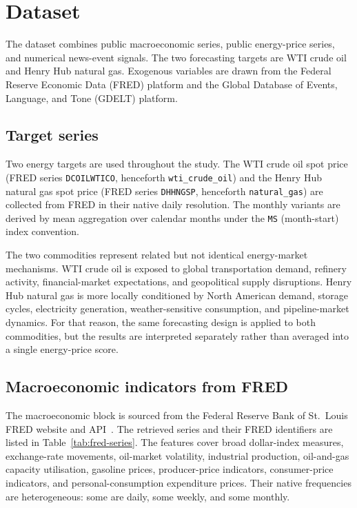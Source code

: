 \documentclass[11pt,a4paper]{article}
\begin{document}
\section{Dataset}\label{sec:dataset}

The dataset combines public macroeconomic series, public energy-price series, and numerical news-event signals. The two forecasting targets are WTI crude oil and Henry Hub natural gas. Exogenous variables are drawn from the Federal Reserve Economic Data (FRED) platform and the Global Database of Events, Language, and Tone (GDELT) platform.

\subsection{Target series}

Two energy targets are used throughout the study. The WTI crude oil spot price (FRED series \texttt{DCOILWTICO}, henceforth \texttt{wti\_crude\_oil}) and the Henry Hub natural gas spot price (FRED series \texttt{DHHNGSP}, henceforth \texttt{natural\_gas}) are collected from FRED in their native daily resolution. The monthly variants are derived by mean aggregation over calendar months under the \texttt{MS} (month-start) index convention.

The two commodities represent related but not identical energy-market mechanisms. WTI crude oil is exposed to global transportation demand, refinery activity, financial-market expectations, and geopolitical supply disruptions. Henry Hub natural gas is more locally conditioned by North American demand, storage cycles, electricity generation, weather-sensitive consumption, and pipeline-market dynamics. For that reason, the same forecasting design is applied to both commodities, but the results are interpreted separately rather than averaged into a single energy-price score.

\subsection{Macroeconomic indicators from FRED}

The macroeconomic block is sourced from the Federal Reserve Bank of St.~Louis FRED website and API~\citep{fred2024}. The retrieved series and their FRED identifiers are listed in Table~\ref{tab:fred-series}. The features cover broad dollar-index measures, exchange-rate movements, oil-market volatility, industrial production, oil-and-gas capacity utilisation, gasoline prices, producer-price indicators, consumer-price indicators, and personal-consumption expenditure prices. Their native frequencies are heterogeneous: some are daily, some weekly, and some monthly.
\end{document}

